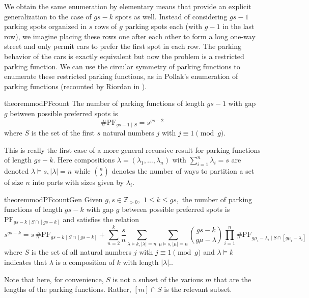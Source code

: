 \documentclass[12 pt]{amsart}
\theoremstyle{definition} %
\theoremstyle{remark} %
\begin{document}
We obtain the same enumeration by elementary means that provide an explicit generalization to the case of $gs - k$ spots as well. Instead of considering $gs - 1$ parking spots organized in $s$ rows of $g$ parking spots each (with $g - 1$ in the last row), we imagine placing these rows one after each other to form a long one-way street and only permit cars to prefer the first spot in each row. The parking behavior of the cars is exactly equivalent but now the problem is a restricted parking function. We can use the circular symmetry of parking functions to enumerate these restricted parking functions, as in Pollak's enumeration of parking functions (recounted by Riordan in \cite{riordan-1969}). 

\begin{restatable}{theorem}{modPFcount}
	\label{thm:modPFcount}
	The number of parking functions of length $gs - 1$ with gap $g$ between possible preferred spots is
	\[
		\# \mathrm{PF}_{gs - 1 \mid S} = s^{gs - 2}
	\]
	where $S$ is the set of the first $s$ natural numbers $j$ with $j \equiv 1 \pmod g$.
\end{restatable}

This is really the first case of a more general recursive result for parking functions of length $gs - k$. Here compositions $\lambda = (\lambda_{1}, \dots, \lambda_{n})$ with $\sum_{i = 1}^{n} \lambda_{i} = s$ are denoted $\lambda\vDash s, \lvert\lambda\rvert = n$ while $\binom{n}{\lambda}$ denotes the number of ways to partition a set of size $n$ into parts with sizes given by $\lambda_i$.

\begin{restatable}{theorem}{modPFcountGen}
	Given $g,s\in\mathbb{Z}_{>0},$ $1\le k\le gs,$ the number of parking functions of length $gs - k$ with gap $g$ between possible preferred spots is $\mathrm{PF}_{gs - k \mid S \cap [gs - k]}$ and satisfies the relation
	\[
		s^{gs - k} = s \, \# \mathrm{PF}_{gs - k \mid S \cap [gs - k]} + \sum_{n = 2}^{k} \frac{s}{n} \sum_{\lambda \vDash k, \lvert \lambda \rvert = n} \sum_{\mu \vDash s, \lvert \mu \rvert = n} \binom{gs - k}{g \mu - \lambda} \prod_{i = 1}^{n} \# \mathrm{PF}_{g \mu_{i} - \lambda_{i} \mid S \cap [g \mu_{i} - \lambda_{i}]}
	\]
	where $S$ is the set of all natural numbers $j$ with $j \equiv 1 \pmod g$ and $\lambda \vDash k$ indicates that $\lambda$ is a composition of $k$ with length $|\lambda|.$.
\end{restatable}

Note that here, for convenience, $S$ is not a subset of the various $m$ that are the lengths of the parking functions. Rather, $[m] \cap S$ is the relevant subset. 
\end{document}
